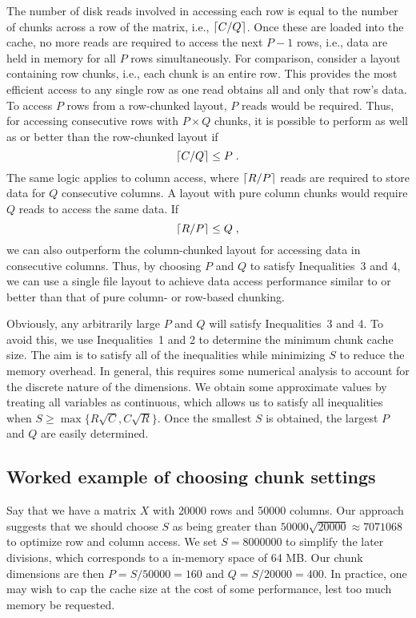 \documentclass{article}
\begin{document}
The number of disk reads involved in accessing each row is equal to the number of chunks across a row of the matrix, i.e., $\left \lceil C/Q \right \rceil$.
Once these are loaded into the cache, no more reads are required to access the next $P-1$ rows, i.e., data are held in memory for all $P$ rows simultaneously.
For comparison, consider a layout containing row chunks, i.e., each chunk is an entire row.
This provides the most efficient access to any single row as one read obtains all and only that row's data.
To access $P$ rows from a row-chunked layout, $P$ reads would be required.
Thus, for accessing consecutive rows with $P \times Q$ chunks, it is possible to perform as well as or better than the row-chunked layout if 
\begin{equation}
\left \lceil C/Q \right \rceil \le P \;.
\end{equation}
The same logic applies to column access, where $\left \lceil R/P \right \rceil$ reads are required to store data for $Q$ consecutive columns.
A layout with pure column chunks would require $Q$ reads to access the same data.
If 
\begin{equation}
\left \lceil R/P \right \rceil \le Q \;,
\end{equation}
we can also outperform the column-chunked layout for accessing data in consecutive columns.
Thus, by choosing $P$ and $Q$ to satisfy Inequalities~3 and 4, we can use a single file layout to achieve data access performance similar to or better than that of pure column- or row-based chunking.

Obviously, any arbitrarily large $P$ and $Q$ will satisfy Inequalities~3 and 4.
To avoid this, we use Inequalities~1 and 2 to determine the minimum chunk cache size.
The aim is to satisfy all of the inequalities while minimizing $S$ to reduce the memory overhead.
In general, this requires some numerical analysis to account for the discrete nature of the dimensions.
We obtain some approximate values by treating all variables as continuous, which allows us to satisfy all inequalities when $S \ge \max\{R\sqrt{C}, C\sqrt{R}\}$.
Once the smallest $S$ is obtained, the largest $P$ and $Q$ are easily determined.

\subsection{Worked example of choosing chunk settings}
Say that we have a matrix $X$ with 20000 rows and 50000 columns.
Our approach suggests that we should choose $S$ as being greater than $50000\sqrt{20000} \approx 7071068$ to optimize row and column access.
We set $S=8000000$ to simplify the later divisions, which corresponds to a in-memory space of 64 MB.
Our chunk dimensions are then $P = S/50000 = 160$ and $Q = S/20000 = 400$.
In practice, one may wish to cap the cache size at the cost of some performance, lest too much memory be requested.
\end{document}
